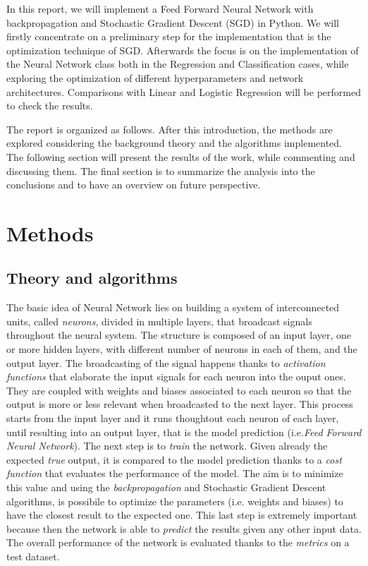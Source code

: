 \documentclass[english,notitlepage,reprint,nofootinbib]{revtex4-1}  %
\begin{document}
In this report, we will implement a Feed Forward Neural Network with backpropagation and Stochastic Gradient Descent (SGD) in Python. We will firstly concentrate on a preliminary step for the implementation that is the optimization technique of SGD. Afterwards the focus is on the implementation of the Neural Network class both in the Regression and Classification cases, while exploring the optimization of different hyperparameters and network architectures. Comparisons with Linear and Logistic Regression will be performed to check the results.

The report is organized as follows. After this introduction, the methods are explored considering the background theory and the algorithms implemented. The following section will present the results of the work, while commenting and discussing them. The final section is to summarize the analysis into the conclusions and to have an overview on future perspective.


    

\section{Methods} \label{sec:methods}
\subsection{Theory and algorithms} \label{sec:theory}

The basic idea of Neural Network lies on building a system of interconnected units, called \textit{neurons}, divided in multiple layers, that broadcast signals throughout the neural system. The structure is composed of an input layer, one or more hidden layers, with different number of neurons in each of them, and the output layer. The broadcasting of the signal happens thanks to \textit{activation functions} that elaborate the input signals for each neuron into the ouput ones. They are coupled with weights and biases associated to each neuron so that the output is more or less relevant when broadcasted to the next layer. This process starts from the input layer and it runs thoughtout each neuron of each layer, until resulting into an output layer, that is the model prediction (i.e.\textit{Feed Forward Neural Network}). The next step is to \textit{train} the network. Given already the expected \textit{true} output, it is compared to the model prediction thanks to a \textit{cost function} that evaluates the performance of the model. The aim is to minimize this value and using the \textit{backpropagation} and Stochastic Gradient Descent algorithms, is possibile to optimize the parameters (i.e. weights and biases) to have the closest result to the expected one. This last step is extremely important because then the network is able to \textit{predict} the results given any other input data. The overall performance of the network is evaluated thanks to the \textit{metrics} on a test dataset.
\end{document}
